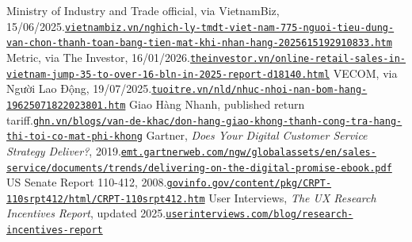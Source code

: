 \documentclass[11pt,a4paper]{article}
\begin{document}
\begin{thebibliography}{9}
\setlength{\itemsep}{0pt}\small\raggedright
\newcommand{\link}[2]{\newline\href{https://#1}{\nolinkurl{#2}}}
 Ministry of Industry and Trade official, via VietnamBiz, 15/06/2025.\link{vietnambiz.vn/nghich-ly-tmdt-viet-nam-775-nguoi-tieu-dung-van-chon-thanh-toan-bang-tien-mat-khi-nhan-hang-2025615192910833.htm}{vietnambiz.vn/nghich-ly-tmdt-viet-nam-775-nguoi-tieu-dung-van-chon-thanh-toan-bang-tien-mat-khi-nhan-hang-2025615192910833.htm}
 Metric, via The Investor, 16/01/2026.\link{theinvestor.vn/online-retail-sales-in-vietnam-jump-35-to-over-16-bln-in-2025-report-d18140.html}{theinvestor.vn/online-retail-sales-in-vietnam-jump-35-to-over-16-bln-in-2025-report-d18140.html}
 VECOM, via Người Lao Động, 19/07/2025.\link{tuoitre.vn/nld/nhuc-nhoi-nan-bom-hang-19625071822023801.htm}{tuoitre.vn/nld/nhuc-nhoi-nan-bom-hang-19625071822023801.htm}
 Giao Hàng Nhanh, published return tariff.\link{ghn.vn/blogs/van-de-khac/don-hang-giao-khong-thanh-cong-tra-hang-thi-toi-co-mat-phi-khong}{ghn.vn/blogs/van-de-khac/don-hang-giao-khong-thanh-cong-tra-hang-thi-toi-co-mat-phi-khong}
 Gartner, \emph{Does Your Digital Customer Service Strategy Deliver?}, 2019.\link{emt.gartnerweb.com/ngw/globalassets/en/sales-service/documents/trends/delivering-on-the-digital-promise-ebook.pdf}{emt.gartnerweb.com/ngw/globalassets/en/sales-service/documents/trends/delivering-on-the-digital-promise-ebook.pdf}
 US Senate Report 110-412, 2008.\link{www.govinfo.gov/content/pkg/CRPT-110srpt412/html/CRPT-110srpt412.htm}{govinfo.gov/content/pkg/CRPT-110srpt412/html/CRPT-110srpt412.htm}
 User Interviews, \emph{The UX Research Incentives Report}, updated 2025.\link{www.userinterviews.com/blog/research-incentives-report}{userinterviews.com/blog/research-incentives-report}
\end{thebibliography}
\end{document}
